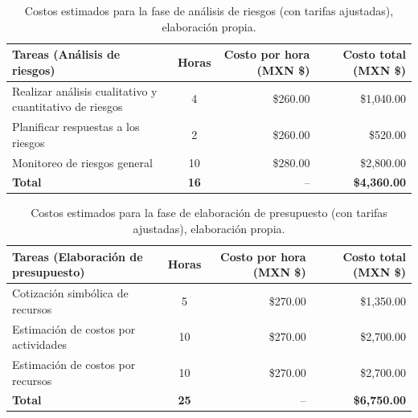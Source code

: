 \begin{table}[H]
	\centering
	\renewcommand{\arraystretch}{1.6}
	\setlength{\tabcolsep}{10pt}
	\Huge
	\begin{adjustbox}{max width=\textwidth}
		\begin{tabular}{|p{9.5cm}|c|r|r|}
			\hline
			\textbf{Tareas (Análisis de riesgos)} & \textbf{Horas} & \textbf{Costo por hora (MXN \$)} & \textbf{Costo total (MXN \$)} \\ \hline
			Realizar análisis cualitativo y cuantitativo de riesgos & 4 & \$260.00 & \$1,040.00 \\ \hline
			Planificar respuestas a los riesgos & 2 & \$260.00 & \$520.00 \\ \hline
			Monitoreo de riesgos general & 10 & \$280.00 & \$2,800.00 \\ \hline
			\textbf{Total} & \textbf{16} & -- & \textbf{\$4,360.00} \\ \hline
		\end{tabular}
	\end{adjustbox}
	\caption[Costos estimados para la fase de análisis de riesgos (con tarifas ajustadas)]{Costos estimados para la fase de análisis de riesgos (con tarifas ajustadas), elaboración propia.} 
	\label{tab:costos_riesgos_actualizado}
\end{table}

\begin{table}[H]
	\centering
	\renewcommand{\arraystretch}{1.6}
	\setlength{\tabcolsep}{10pt}
	\Huge
	\begin{adjustbox}{max width=\textwidth}
		\begin{tabular}{|p{9.5cm}|c|r|r|}
			\hline
			\textbf{Tareas (Elaboración de presupuesto)} & \textbf{Horas} & \textbf{Costo por hora (MXN \$)} & \textbf{Costo total (MXN \$)} \\ \hline
			Cotización simbólica de recursos & 5 & \$270.00 & \$1,350.00 \\ \hline
			Estimación de costos por actividades & 10 & \$270.00 & \$2,700.00 \\ \hline
			Estimación de costos por recursos & 10 & \$270.00 & \$2,700.00 \\ \hline
			\textbf{Total} & \textbf{25} & -- & \textbf{\$6,750.00} \\ \hline
		\end{tabular}
	\end{adjustbox}
	\caption[Costos estimados para la fase de elaboración de presupuesto (con tarifas ajustadas)]{Costos estimados para la fase de elaboración de presupuesto (con tarifas ajustadas), elaboración propia.} 
	\label{tab:costos_presupuesto_actualizado}
\end{table}

